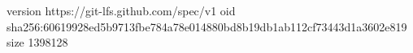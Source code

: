 version https://git-lfs.github.com/spec/v1
oid sha256:60619928ed5b9713fbe784a78e014880bd8b19db1ab112cf73443d1a3602e819
size 1398128

